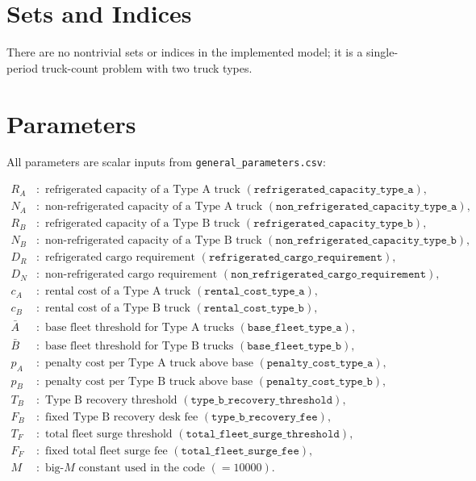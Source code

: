 \section*{Sets and Indices}

There are no nontrivial sets or indices in the implemented model; it is a single-period truck-count problem with two truck types.

\section*{Parameters}

All parameters are scalar inputs from \texttt{general\_parameters.csv}:

\[
\begin{aligned}
R_A &:\text{ refrigerated capacity of a Type A truck } (\texttt{refrigerated\_capacity\_type\_a}),\\
N_A &:\text{ non-refrigerated capacity of a Type A truck } (\texttt{non\_refrigerated\_capacity\_type\_a}),\\
R_B &:\text{ refrigerated capacity of a Type B truck } (\texttt{refrigerated\_capacity\_type\_b}),\\
N_B &:\text{ non-refrigerated capacity of a Type B truck } (\texttt{non\_refrigerated\_capacity\_type\_b}),\\
D_R &:\text{ refrigerated cargo requirement } (\texttt{refrigerated\_cargo\_requirement}),\\
D_N &:\text{ non-refrigerated cargo requirement } (\texttt{non\_refrigerated\_cargo\_requirement}),\\
c_A &:\text{ rental cost of a Type A truck } (\texttt{rental\_cost\_type\_a}),\\
c_B &:\text{ rental cost of a Type B truck } (\texttt{rental\_cost\_type\_b}),\\
\bar A &:\text{ base fleet threshold for Type A trucks } (\texttt{base\_fleet\_type\_a}),\\
\bar B &:\text{ base fleet threshold for Type B trucks } (\texttt{base\_fleet\_type\_b}),\\
p_A &:\text{ penalty cost per Type A truck above base } (\texttt{penalty\_cost\_type\_a}),\\
p_B &:\text{ penalty cost per Type B truck above base } (\texttt{penalty\_cost\_type\_b}),\\
T_B &:\text{ Type B recovery threshold } (\texttt{type\_b\_recovery\_threshold}),\\
F_B &:\text{ fixed Type B recovery desk fee } (\texttt{type\_b\_recovery\_fee}),\\
T_F &:\text{ total fleet surge threshold } (\texttt{total\_fleet\_surge\_threshold}),\\
F_F &:\text{ fixed total fleet surge fee } (\texttt{total\_fleet\_surge\_fee}),\\
M &:\text{ big-}M\text{ constant used in the code } (=10000).
\end{aligned}
\]

